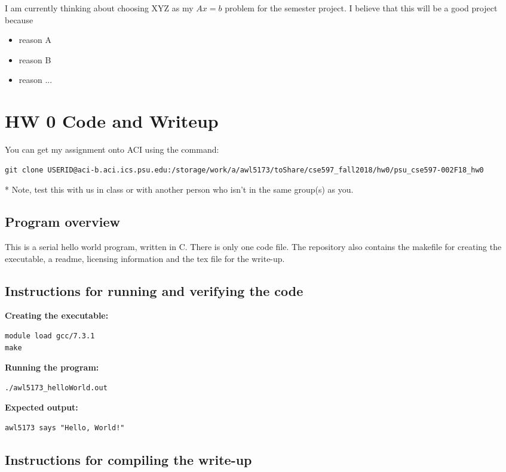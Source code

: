\documentclass{article}
\begin{document}
\begin{spacing}{1.1}
I am currently thinking about choosing XYZ as my $Ax=b$ problem for the semester project. I believe that this will be a good project because
\begin{itemize}
  \item reason A
  \item reason B
  \item reason ...
\end{itemize}


\section{HW 0 Code and Writeup}

You can get my assignment onto ACI using the command:

\begin{verbatim}
git clone USERID@aci-b.aci.ics.psu.edu:/storage/work/a/awl5173/toShare/cse597_fall2018/hw0/psu_cse597-002F18_hw0
\end{verbatim}

* Note, test this with us in class or with another person who isn't in the same group(s) as you.

\subsection{Program overview}

This is a serial hello world program, written in C. There is only one code file. The repository also contains the makefile for creating the executable, a readme, licensing information and the tex file for the write-up.


\subsection{Instructions for running and verifying the code}

\textbf{Creating the executable:}
\begin{verbatim}
module load gcc/7.3.1
make
\end{verbatim}

\textbf{Running the program:}
\begin{verbatim}
./awl5173_helloWorld.out
\end{verbatim}

\textbf{Expected output:}
\begin{verbatim}
awl5173 says "Hello, World!"
\end{verbatim}

\subsection{Instructions for compiling the write-up}


\end{spacing}
\end{document}
